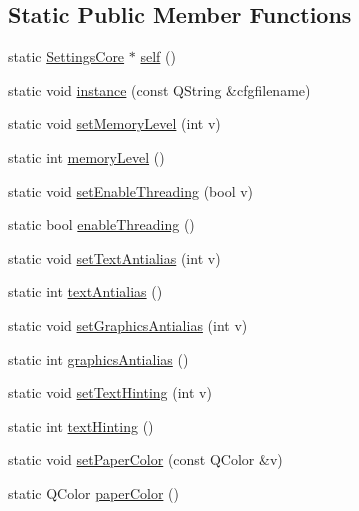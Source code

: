 \subsection*{Static Public Member Functions}
\begin{DoxyCompactItemize}
\item 
static \hyperlink{classOkular_1_1SettingsCore}{Settings\+Core} $\ast$ \hyperlink{classOkular_1_1SettingsCore_a60469aecc551f42c5ccba8288e666e40}{self} ()
\item 
static void \hyperlink{classOkular_1_1SettingsCore_ada4e5acb848023d2ac0684c12acf4043}{instance} (const Q\+String \&cfgfilename)
\item 
static void \hyperlink{classOkular_1_1SettingsCore_ab1004aa129590021db9690e3bcd47523}{set\+Memory\+Level} (int v)
\item 
static int \hyperlink{classOkular_1_1SettingsCore_a07d75a8b7db6da9213663287a87e3226}{memory\+Level} ()
\item 
static void \hyperlink{classOkular_1_1SettingsCore_a6a4ea4e50728b16aa343c7227a7c01bc}{set\+Enable\+Threading} (bool v)
\item 
static bool \hyperlink{classOkular_1_1SettingsCore_a25f88d55c5013be1f40c2def572fa69f}{enable\+Threading} ()
\item 
static void \hyperlink{classOkular_1_1SettingsCore_a201025123d4a37983a0bb430f864ff96}{set\+Text\+Antialias} (int v)
\item 
static int \hyperlink{classOkular_1_1SettingsCore_acfbe444f3d02896d1873772367a6debf}{text\+Antialias} ()
\item 
static void \hyperlink{classOkular_1_1SettingsCore_a647da4292314989408362e8469e7c6cc}{set\+Graphics\+Antialias} (int v)
\item 
static int \hyperlink{classOkular_1_1SettingsCore_af8bee5068d82bead0102830766a19c2a}{graphics\+Antialias} ()
\item 
static void \hyperlink{classOkular_1_1SettingsCore_a3f4412e7f74a01f26a8240e016ad87c7}{set\+Text\+Hinting} (int v)
\item 
static int \hyperlink{classOkular_1_1SettingsCore_a82e159d93aed4f7bab34b3be08b62886}{text\+Hinting} ()
\item 
static void \hyperlink{classOkular_1_1SettingsCore_a79d4da8e09fe8f83f24d74ab84821253}{set\+Paper\+Color} (const Q\+Color \&v)
\item 
static Q\+Color \hyperlink{classOkular_1_1SettingsCore_ab59e5e75137763e3a97b545dcfd2bb30}{paper\+Color} ()
\item 

\end{DoxyCompactItemize}
